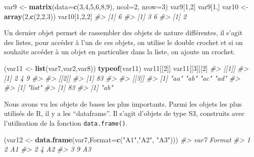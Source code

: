 \documentclass[]{article}
\newenvironment{Shaded}{\begin{snugshade}}{\end{snugshade}}
\newcommand{\CommentTok}[1]{\textcolor[rgb]{0.56,0.35,0.01}{\textit{#1}}}
\newcommand{\DataTypeTok}[1]{\textcolor[rgb]{0.13,0.29,0.53}{#1}}
\newcommand{\DecValTok}[1]{\textcolor[rgb]{0.00,0.00,0.81}{#1}}
\newcommand{\KeywordTok}[1]{\textcolor[rgb]{0.13,0.29,0.53}{\textbf{#1}}}
\newcommand{\NormalTok}[1]{#1}
\newcommand{\StringTok}[1]{\textcolor[rgb]{0.31,0.60,0.02}{#1}}
\begin{document}
\begin{Shaded}
\begin{Highlighting}[]
\NormalTok{var9 <-}\StringTok{ }\KeywordTok{matrix}\NormalTok{(}\DataTypeTok{data=}\KeywordTok{c}\NormalTok{(}\DecValTok{3}\NormalTok{,}\DecValTok{4}\NormalTok{,}\DecValTok{5}\NormalTok{,}\DecValTok{6}\NormalTok{,}\DecValTok{8}\NormalTok{,}\DecValTok{9}\NormalTok{), }\DataTypeTok{ncol=}\DecValTok{2}\NormalTok{, }\DataTypeTok{nrow=}\DecValTok{3}\NormalTok{)}
\NormalTok{var9[}\DecValTok{1}\NormalTok{,}\DecValTok{2}\NormalTok{]}
\NormalTok{var9[}\DecValTok{1}\NormalTok{,]}
\NormalTok{var10 <-}\StringTok{ }\KeywordTok{array}\NormalTok{(}\DecValTok{2}\NormalTok{,}\KeywordTok{c}\NormalTok{(}\DecValTok{2}\NormalTok{,}\DecValTok{2}\NormalTok{,}\DecValTok{3}\NormalTok{))}
\NormalTok{var10[}\DecValTok{1}\NormalTok{,}\DecValTok{2}\NormalTok{,}\DecValTok{2}\NormalTok{]}
\CommentTok{#> [1] 6}
\CommentTok{#> [1] 3 6}
\CommentTok{#> [1] 2}
\end{Highlighting}
\end{Shaded}

Un dernier objet permet de rassembler des objets de nature différentes, il
s'agit des listes, pour accéder à l'un de ces objets, on utilise le double
crochet et si on souhaite accéder à un objet en particulier dans la liste, on
ajoute un crochet.

\begin{Shaded}
\begin{Highlighting}[]
\NormalTok{(var11 <-}\StringTok{ }\KeywordTok{list}\NormalTok{(var7,var2,var8))}
\KeywordTok{typeof}\NormalTok{(var11)}
\NormalTok{var11[[}\DecValTok{2}\NormalTok{]]}
\NormalTok{var11[[}\DecValTok{3}\NormalTok{]][}\DecValTok{2}\NormalTok{]}
\CommentTok{#> [[1]]}
\CommentTok{#> [1] 2 4 9}
\CommentTok{#> }
\CommentTok{#> [[2]]}
\CommentTok{#> [1] 83}
\CommentTok{#> }
\CommentTok{#> [[3]]}
\CommentTok{#> [1] "aa" "ab" "ac" "ad"}
\CommentTok{#> }
\CommentTok{#> [1] "list"}
\CommentTok{#> [1] 83}
\CommentTok{#> [1] "ab"}
\end{Highlighting}
\end{Shaded}

Nous avons vu les objets de bases les plus importants. Parmi les objets les plus
utilisés de R, il y a les ``dataframe''. Il s'agit d'objets de type S3, construits
avec l'utilisation de la fonction \texttt{data.frame()}.

\begin{Shaded}
\begin{Highlighting}[]
\NormalTok{(var12 <-}\StringTok{ }\KeywordTok{data.frame}\NormalTok{(var7,}\DataTypeTok{Format=}\KeywordTok{c}\NormalTok{(}\StringTok{"A1"}\NormalTok{,}\StringTok{"A2"}\NormalTok{,}
  \StringTok{"A3"}\NormalTok{)))}
\CommentTok{#>   var7 Format}
\CommentTok{#> 1    2     A1}
\CommentTok{#> 2    4     A2}
\CommentTok{#> 3    9     A3}
\end{Highlighting}
\end{Shaded}
\end{document}
